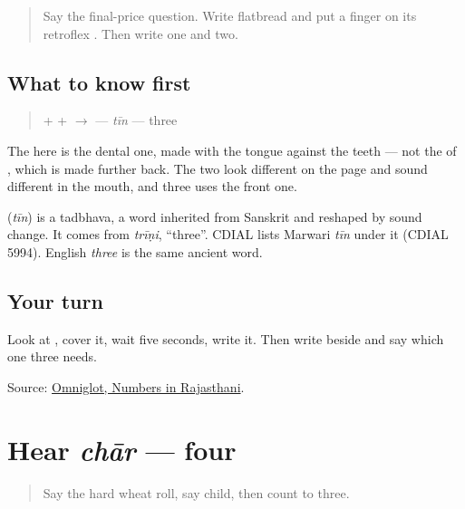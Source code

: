 \label{lesson:MW-C32-teen}



\begin{quote}
Say the final-price question. Write flatbread and put a finger on its retroflex \textbf{}. Then write one and two.
\end{quote}

\subsection*{What to know first}
\begin{quote}
\textbf{} + \textbf{} + \textbf{} $\to$ \textbf{} — \emph{tīn} — three
\end{quote}

The \textbf{} here is the dental one, made with the tongue against the teeth — not the \textbf{} of \textbf{}, which is made further back. The two look different on the page and sound different in the mouth, and three uses the front one.

\begin{cousinweb}
\textbf{} (\emph{tīn}) is a tadbhava, a word inherited from Sanskrit and reshaped by sound change. It comes from \emph{trīṇi}, \textquotedblleft{}three\textquotedblright{}. CDIAL lists Marwari \emph{tīn} under it (CDIAL 5994). English \emph{three} is the same ancient word.
\end{cousinweb}

\subsection*{Your turn}
Look at \textbf{}, cover it, wait five seconds, write it. Then write \textbf{} beside \textbf{} and say which one three needs.

\begin{tcolorbox}[breakable,colback=teal!4,colframe=teal!35!black,title={Before you move on}]
Source: \href{https://www.omniglot.com/language/numbers/rajasthani.htm}{Omniglot, Numbers in Rajasthani}.
\end{tcolorbox}
\section[chār]{Hear \emph{chār} — four}

\label{lesson:MW-C32-hear-chaar}



\begin{quote}
Say the hard wheat roll, say child, then count to three.
\end{quote}

